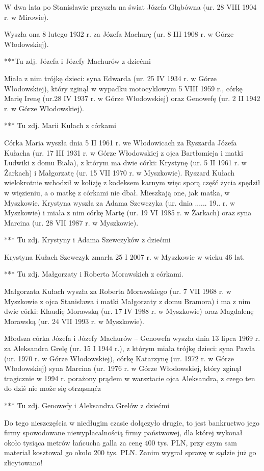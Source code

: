 W dwa lata po Stanisławie przyszła na świat Józefa Głąbówna (ur. 28 VIII 1904 r. w Mirowie).

Wyszła ona 8 lutego 1932 r. za Józefa Machurę (ur. 8 III 1908 r. w Górze Włodowskiej).

{\color{red}
***Tu zdj. Józefa i Józefy Machurów z dziećmi}

Miała z nim trójkę dzieci: syna Edwarda (ur. 25 IV 1934 r. w Górze Włodowskiej), który zginął w wypadku motocyklowym 5 VIII 1959 r., córkę Marię Irenę (ur.28 IV 1937 r. w Górze Włodowskiej) oraz Genowefę (ur. 2 II 1942 r. w Górze Włodowskiej).

{\color{red}
*** Tu zdj. Marii Kułach z córkami}

Córka Maria wyszła dnia 5 II 1961 r. we Włodowicach za Ryszarda Józefa Kułacha (ur. 17 III 1931 r. w Górze Włodowskiej z ojca Bartłomieja i matki Ludwiki z domu Biała), z którym ma dwie córki: Krystynę (ur. 5 II 1961 r. w Żarkach) i Małgorzatę (ur. 15 VII 1970 r. w Myszkowie). Ryszard Kułach wielokrotnie wchodził w kolizję z kodeksem karnym więc sporą część życia spędził w więzieniu, a o matkę z córkami nie dbał. Mieszkają one, jak matka, w Myszkowie. Krystyna wyszła za Adama Szewczyka (ur. dnia ...... 19.. r. w Myszkowie) i miała z nim córkę Martę (ur. 19 VI 1985 r. w Żarkach) oraz syna Marcina (ur. 28 VII 1987 r. w Myszkowie).

{\color{red}
*** Tu zdj. Krystyny i Adama Szewczyków z dziećmi}

Krystyna Kułach Szewczyk zmarła 25 I 2007 r. w Myszkowie w wieku 46 lat.

{\color{red}
*** Tu zdj. Małgorzaty i Roberta Morawskich z córkami.}

Małgorzata Kułach wyszła za Roberta Morawskiego (ur. 7 VII 1968 r. w Myszkowie z ojca Stanisława i matki Małgorzaty z domu Bramora) i ma z nim dwie córki: Klaudię Morawską (ur. 17 IV 1988 r. w Myszkowie) oraz Magdalenę Morawską (ur. 24 VII 1993 r. w Myszkowie). 

Młodsza  córka Józefa i Józefy Machurów -- Genowefa wyszła dnia 13 lipca 1969 r. za Aleksandra Grelę (ur. 15 I 1944 r.), z którym miała trójkę dzieci: syna Pawła (ur. 1970 r. w Górze Włodowskiej), córkę Katarzynę (ur. 1972 r. w Górze Włodowskiej) syna Marcina (ur. 1976 r. w Górze Włodowskiej, który zginął tragicznie w 1994 r. porażony prądem w warsztacie ojca Aleksandra, z czego ten do dziś nie może się otrząsnąćz

{\color{red}
*** Tu zdj. Genowefy i Aleksandra Grelów z dziećmi}

Do tego nieszczęścia w niedługim czasie dołączyło drugie, to jest bankructwo jego firmy spowodowane niewypłacalnością firmy państwowej, dla której wykonał około tysiąca metrów łańcucha galla za cenę 400 tys. PLN, przy czym sam materiał kosztował go około 200 tys. PLN. Zanim wygrał sprawę w sądzie już go zlicytowano!
